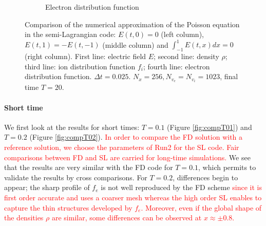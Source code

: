 \documentclass{article}
\numberwithin{equation}{section}
\begin{document}
\begin{figure}
\begin{subfigure}{\textwidth}
		\caption{Electron distribution function}
	\end{subfigure}
	\caption{Comparison of the numerical approximation of the Poisson equation in the semi-Lagrangian code: $E(t,0)=0$ (left column), $E(t,1)=-E(t,-1)$ (middle column) and $\int_{-1}^1E(t,x)dx=0$ (right column). First line: electric field $E$; second line: density $\rho$; 
	third line: ion distribution function $f_i$; fourth line: electron distribution function. 
		 $\Delta t=0.025$. $N_x=256, N_{v_e}=N_{v_i}=1023$, final time $T=20$. }
	\label{fig:comp_E0_intE0}
\end{figure}  

\paragraph{Short time}

We first look at the results for short times: $T=0.1$ (Figure \ref{fig:compT01}) and $T=0.2$ (Figure \ref{fig:compT02}). 
\textcolor{red}{In order to compare the FD solution with a reference solution, we choose the parameters of Run2 for the SL code. Fair comparisons between FD and SL are carried for long-time simulations.}
We see that the results are very similar with the FD code for $T=0.1$, which permits to validate the results by cross comparisons. For $T=0.2$, differences begin to appear; the sharp profile of $f_e$ is not well reproduced by the FD scheme  \textcolor{red}{since it 
is first order accurate and uses a coarser mesh whereas the high order SL enables to capture the thin structures developed by $f_e$. 
Moreover, even if the global shape of the densities $\rho$ are similar, some differences can be observed at $x\approx \pm 0.8$. }  

\end{document}
